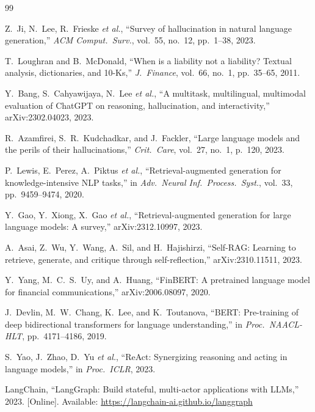 \documentclass[10pt,journal,compsoc]{IEEEtran}
\begin{document}
\begin{thebibliography}{99}

Z.~Ji, N.~Lee, R.~Frieske \emph{et al.},
``Survey of hallucination in natural language generation,''
\emph{ACM Comput.\ Surv.}, vol.~55, no.~12, pp.~1--38, 2023.

T.~Loughran and B.~McDonald,
``When is a liability not a liability? Textual analysis, dictionaries,
and 10-Ks,''
\emph{J.~Finance}, vol.~66, no.~1, pp.~35--65, 2011.

Y.~Bang, S.~Cahyawijaya, N.~Lee \emph{et al.},
``A multitask, multilingual, multimodal evaluation of ChatGPT on
reasoning, hallucination, and interactivity,''
arXiv:2302.04023, 2023.

R.~Azamfirei, S.~R.~Kudchadkar, and J.~Fackler,
``Large language models and the perils of their hallucinations,''
\emph{Crit.\ Care}, vol.~27, no.~1, p.~120, 2023.

P.~Lewis, E.~Perez, A.~Piktus \emph{et al.},
``Retrieval-augmented generation for knowledge-intensive NLP tasks,''
in \emph{Adv.\ Neural Inf.\ Process.\ Syst.}, vol.~33,
pp.~9459--9474, 2020.

Y.~Gao, Y.~Xiong, X.~Gao \emph{et al.},
``Retrieval-augmented generation for large language models: A survey,''
arXiv:2312.10997, 2023.

A.~Asai, Z.~Wu, Y.~Wang, A.~Sil, and H.~Hajishirzi,
``Self-RAG: Learning to retrieve, generate, and critique through
self-reflection,''
arXiv:2310.11511, 2023.

Y.~Yang, M.~C.~S.~Uy, and A.~Huang,
``FinBERT: A pretrained language model for financial communications,''
arXiv:2006.08097, 2020.

J.~Devlin, M.~W.~Chang, K.~Lee, and K.~Toutanova,
``BERT: Pre-training of deep bidirectional transformers for language
understanding,''
in \emph{Proc.\ NAACL-HLT}, pp.~4171--4186, 2019.

S.~Yao, J.~Zhao, D.~Yu \emph{et al.},
``ReAct: Synergizing reasoning and acting in language models,''
in \emph{Proc.\ ICLR}, 2023.

LangChain,
``LangGraph: Build stateful, multi-actor applications with LLMs,''
2023. [Online]. Available: \url{https://langchain-ai.github.io/langgraph}


\end{thebibliography}
\end{document}
